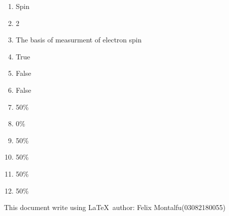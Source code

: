 \documentclass[a4paper]{article}
\begin{document}
    \begin{enumerate}[1.]
        \item Spin
        \item 2
        \item The basis of measurment of electron spin
        \item True
        \item False
        \item False
        \item 50\%
        \item 0\%
        \item 50\%
        \item 50\%
        \item 50\%
        \item 50\%
    \end{enumerate}
    This document write using \LaTeX \ author: Felix Montalfu(03082180055)
\end{document}
